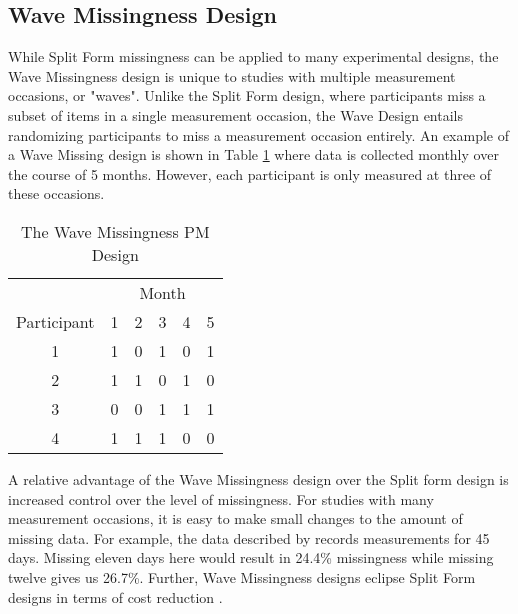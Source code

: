 \documentclass{svjour3}                     %
\begin{document}
\subsection{Wave Missingness Design}
\label{sec:1.2}
While Split Form missingness can be applied to many experimental designs, the Wave Missingness design \citep{little2013planned} is unique to studies with multiple measurement occasions, or "waves". Unlike the Split Form design, where participants miss a subset of items in a single measurement occasion, the Wave Design entails randomizing participants to miss a measurement occasion entirely. An example of a Wave Missing design is shown in Table \ref{tab:table11} where data is collected monthly over the course of 5 months. However, each participant is only measured at three of these occasions. \par

\begin{table}[b!]
	\centering
	\caption{The Wave Missingness PM Design}
	\label{tab:table11}
	\setlength{\tabcolsep}{0.75cm}
	\begin{tabular}{c|ccccc}
		\toprule
		& \multicolumn{5}{c}{Month} \\
		Participant & 1 & 2 & 3 & 4 & 5 \\
		\midrule
		1 & 1 & 0 & 1 & 0 & 1 \\
		2 & 1 & 1 & 0 & 1 & 0 \\
		3 & 0 & 0 & 1 & 1 & 1 \\
		4 & 1 & 1 & 1 & 0 & 0 \\
		\bottomrule
	\end{tabular}
\end{table}


A relative advantage of the Wave Missingness design over the Split form design is increased control over the level of missingness. For studies with many measurement occasions, it is easy to make small changes to the amount of missing data. For example, the data described by \citet{pellowski2016alcohol} records measurements for 45 days. Missing eleven days here would result in 24.4\% missingness while missing twelve gives us 26.7\%. Further, Wave Missingness designs eclipse Split Form designs in terms of cost reduction \citep{little2013planned}. \par
\end{document}
